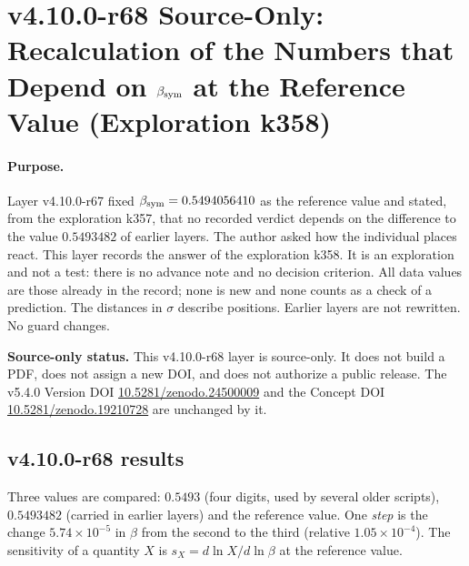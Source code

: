 
\clearpage
\section*{v4.10.0-r68 Source-Only: Recalculation of the Numbers that Depend on \texorpdfstring{\(\beta_{\rm sym}\)}{beta sym} at the Reference Value (Exploration k358)}
\label{sec:v4100-r68-recalculation}

\paragraph{Purpose.}
Layer v4.10.0-r67 fixed \(\beta_{\rm sym}=0.5494056410\) as the reference value and stated, from the exploration k357, that no recorded verdict
depends on the difference to the value \(0.5493482\) of earlier layers.  The author asked how the individual places react.  This layer records
the answer of the exploration k358.  It is an exploration and not a test: there is no advance note and no decision criterion.  All data values
are those already in the record; none is new and none counts as a check of a prediction.  The distances in \(\sigma\) describe positions.
Earlier layers are not rewritten.  No guard changes.

\noindent\textbf{Source-only status.}
This v4.10.0-r68 layer is source-only.  It does not build a PDF, does not assign a new DOI,
and does not authorize a public release.  The v5.4.0 Version DOI
\href{https://doi.org/10.5281/zenodo.24500009}{10.5281/zenodo.24500009} and the Concept DOI
\href{https://doi.org/10.5281/zenodo.19210728}{10.5281/zenodo.19210728} are unchanged by it.

\subsection*{v4.10.0-r68 results}
\label{subsec:v4100-r68-results}

Three values are compared: \(0.5493\) (four digits, used by several older scripts), \(0.5493482\) (carried in earlier layers) and the reference
value.  One \emph{step} is the change \(5.74\times10^{-5}\) in \(\beta\) from the second to the third (relative \(1.05\times10^{-4}\)).
The sensitivity of a quantity \(X\) is \(s_X=d\ln X/d\ln\beta\) at the reference value.

